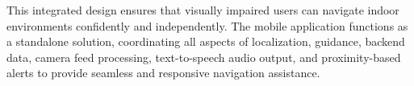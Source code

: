 This integrated design ensures that visually impaired users can navigate indoor environments confidently and independently. The mobile application functions as a standalone solution, coordinating all aspects of localization, guidance, backend data, camera feed processing, text-to-speech audio output, and proximity-based alerts to provide seamless and responsive navigation assistance.